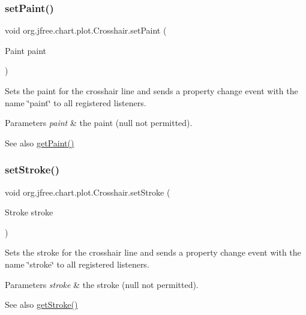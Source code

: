 \subsubsection{\texorpdfstring{set\+Paint()}{setPaint()}}
{\footnotesize\ttfamily void org.\+jfree.\+chart.\+plot.\+Crosshair.\+set\+Paint (\begin{DoxyParamCaption}\item[{Paint}]{paint }\end{DoxyParamCaption})}

Sets the paint for the crosshair line and sends a property change event with the name \char`\"{}paint\char`\"{} to all registered listeners.


\begin{DoxyParams}{Parameters}
{\em paint} & the paint ({\ttfamily null} not permitted).\\
\hline
\end{DoxyParams}
\begin{DoxySeeAlso}{See also}
\mbox{\hyperlink{classorg_1_1jfree_1_1chart_1_1plot_1_1_crosshair_a95c5923d9ef143cea6cdd735d43f420a}{get\+Paint()}} 
\end{DoxySeeAlso}
\mbox{\label{classorg_1_1jfree_1_1chart_1_1plot_1_1_crosshair_afa44c3954b377eea8f5df66affefc242}} 
\subsubsection{\texorpdfstring{set\+Stroke()}{setStroke()}}
{\footnotesize\ttfamily void org.\+jfree.\+chart.\+plot.\+Crosshair.\+set\+Stroke (\begin{DoxyParamCaption}\item[{Stroke}]{stroke }\end{DoxyParamCaption})}

Sets the stroke for the crosshair line and sends a property change event with the name \char`\"{}stroke\char`\"{} to all registered listeners.


\begin{DoxyParams}{Parameters}
{\em stroke} & the stroke ({\ttfamily null} not permitted).\\
\hline
\end{DoxyParams}
\begin{DoxySeeAlso}{See also}
\mbox{\hyperlink{classorg_1_1jfree_1_1chart_1_1plot_1_1_crosshair_a41dcb9cd8c65d0630b74cd1488d0c4fd}{get\+Stroke()}} 
\end{DoxySeeAlso}
\mbox{\label{classorg_1_1jfree_1_1chart_1_1plot_1_1_crosshair_a8f53f7fe5b2f9f7ad0846a6b5f218079}} 

